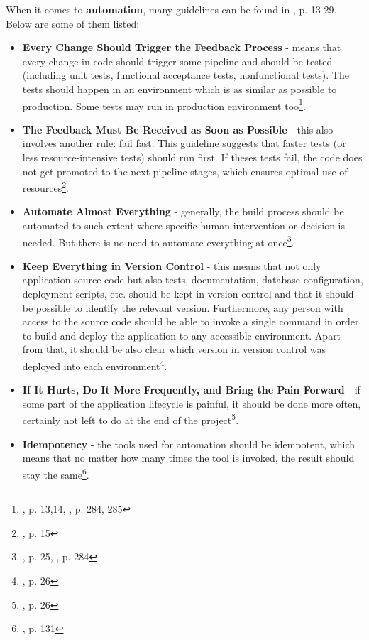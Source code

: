 When it comes to \textbf{automation}, many guidelines can be found in \cite{book-cicd}, p. 13-29. Below are some of them listed:
\begin{itemize}
\item \textbf{Every Change Should Trigger the Feedback Process} - means that every change in code should trigger some pipeline and should be tested (including unit tests, functional acceptance tests, nonfunctional tests). The tests should happen in an environment which is as similar as possible to production. Some tests may run in production environment too\footnote{\cite{book-cicd}, p. 13,14, \cite{book-iac}, p. 284, 285}.
\item \textbf{The Feedback Must Be Received as Soon as Possible} - this also involves another rule: fail fast. This guideline suggests that faster tests (or less resource-intensive tests) should run first. If theses tests fail, the code does not get promoted to the next pipeline stages, which ensures optimal use of resources\footnote{\cite{book-cicd}, p. 15}.
\item \textbf{Automate Almost Everything} - generally, the build process should be automated to such extent where specific human intervention or decision is needed. But there is no need to automate everything at once\footnote{\cite{book-cicd}, p. 25, \cite{book-iac}, p. 284}.
\item \textbf{Keep Everything in Version Control} - this means that not only application source code but also tests, documentation, database configuration, deployment scripts, etc. should be kept in version control and that it should be possible to identify the relevant version. Furthermore, any person with access to the source code should be able to invoke a single command in order to build and deploy the application to any accessible environment. Apart from that, it should be also clear which version in version control was deployed into each environment\footnote{\cite{book-cicd}, p. 26}.
\item \textbf{If It Hurts, Do It More Frequently, and Bring the Pain Forward} - if some part of the application lifecycle is painful, it should be done more often, certainly not left to do at the end of the project\footnote{\cite{book-cicd}, p. 26}.
\item \textbf{Idempotency} - the tools used for automation should be idempotent, which means that no matter how many times the tool is invoked, the result should stay the same\footnote{\cite{book-iac}, p. 131}.
\end{itemize}

